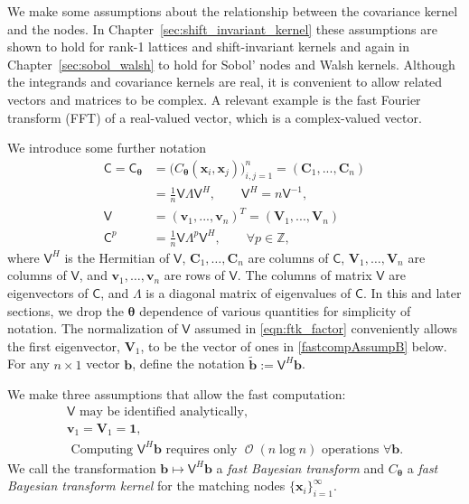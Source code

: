 \documentclass{iitthesis}          %
\DeclareMathOperator{\Order}{{\mathcal O}}
\newcommand{\bm}[1]{\boldsymbol{#1}}
\newcommand{\integers}{\mathbb{Z}}
\newcommand{\vtheta}{{\bm{\theta}}}
\newcommand{\vb}{\bm{b}}
\newcommand{\vC}{\bm{C}}
\newcommand{\vv}{\bm{v}}
\newcommand{\vV}{\bm{V}}
\newcommand{\vx}{\bm{x}}
\newcommand{\vone}{\bm{1}}
\newcommand{\mC}{\mathsf{C}}
\newcommand{\mCtheta}{{\mathsf{C}_{\vtheta}}}
\newcommand{\mLambda}{\mathsf{\Lambda}}
\newcommand{\mV}{\mathsf{V}}
\begin{document}

We make some assumptions about the relationship between the covariance kernel and the nodes. 
In Chapter~\ref{sec:shift_invariant_kernel} these assumptions are shown to hold  for rank-1 lattices and shift-invariant kernels and again in Chapter~\ref{sec:sobol_walsh} to hold for Sobol' nodes and Walsh kernels.  Although the integrands and covariance kernels are real, it is convenient to allow related vectors and matrices to be complex.  A relevant example is the fast Fourier transform (FFT) of a real-valued vector, which is a complex-valued vector.

We introduce some further notation
\begin{align}
\nonumber
\mC = \mCtheta &= \Big(C_\vtheta(\vx_i,\vx_j)\Big)_{i,j=1}^n  = (\vC_1,...,\vC_n) 
\\
\label{eqn:ftk_factor}
&= \frac 1n \mV \mLambda \mV^H , 
\quad \quad \mV^H = n \mV^{-1}, \\
\nonumber
\mV &= (\vv_1,...,\vv_n)^T = (\vV_1,...,\vV_n) \\
\nonumber
\mC^p  &= \frac 1n \mV \mLambda^{p} \mV^H, \qquad \forall p \in \integers,
\end{align}
where $\mV^H$ is the Hermitian of $\mV$, $\vC_1,\dots,\vC_n$ are columns of $\mC$,  $\vV_1,\dots,\vV_n$ are columns of $\mV$, and $\vv_1,\dots,\vv_n$ are rows of $\mV$. 
The columns of matrix $\mV$ are eigenvectors of $\mC$, and $\mLambda$ is a diagonal matrix of eigenvalues of $\mC$.
In this and later sections, we drop the $\vtheta$ dependence of various quantities for simplicity of notation.  The normalization of $\mV$ assumed in \eqref{eqn:ftk_factor} conveniently allows the first eigenvector, $\vV_1$, to be the vector of ones in \eqref{fastcompAssumpB} below.  
For any $n \times 1$ vector $\vb$, define the notation  $\widetilde{\vb} := \mV^H \vb$.

We make three assumptions that allow the fast computation:
\begin{subequations} \label{fastcompAssump}
	\begin{gather}
	\label{fastcompAssumpA}
	\mV \text{ may be identified analytically}, \\
	\label{fastcompAssumpB}
	\vv_1 = \vV_1 = \vone, \\
	\label{fastcompAssumpC}
	\text{ Computing $\mV^H \vb$ requires only $\Order(n \log n)$ operations } \forall \vb.
	\end{gather}
\end{subequations}
We call the transformation $\vb \mapsto \mV^H \vb$ a \emph{fast Bayesian transform} and $C_\vtheta$ a \emph{fast Bayesian transform kernel} for the matching nodes $\{\vx_i\}_{i=1}^\infty$.  
\end{document}
